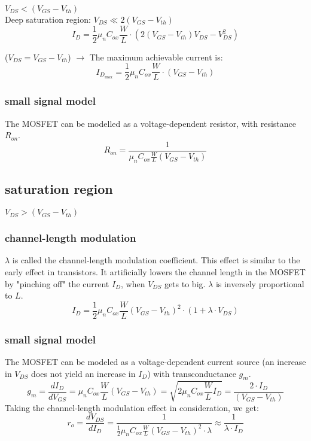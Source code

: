 \documentclass[11ypt]{extarticle}
\begin{document}
$V_{DS} < (V_{GS} - V_{th})$
\\
Deep saturation region: $V_{DS} \ll 2(V_{GS} - V_{th})$
\begin{equation}
    I_D = \frac{1}{2} \mu_n C_{ox} \frac{W}{L} \cdot (2(V_{GS} - V_{th})V_{DS} - {V_{DS}^2})
\end{equation}

($V_{DS} = V_{GS} - V_{th}$) $\rightarrow$ The maximum achievable current is: 
\begin{equation}
    I_{D_{\text{max}}} = \frac{1}{2} \mu_n C_{ox} \frac{W}{L} \cdot (V_{GS} - V_{th})
\end{equation}

\subsubsection{small signal model}

The MOSFET can be modelled as a voltage-dependent resistor, with resistance $R_{on}$.
\begin{equation}
   R_{on} = \frac{1}{\mu_n C_{ox} \frac{W}{L}(V_{GS} - V_{th})}
\end{equation}

\subsection{saturation region}

$V_{DS} > (V_{GS} - V_{th})$

\subsubsection{channel-length modulation}

$\lambda$ is called the channel-length modulation coefficient. This effect is similar to the early effect in transistors. It artificially lowers the channel length in the MOSFET by "pinching off" the current $I_D$, when $V_{DS}$ gets to big. $\lambda$ is inversely proportional to $L$.
\begin{equation}
    I_D= \frac{1}{2}\mu_n C_{ox} \frac{W}{L}(V_{GS} - V_{th})^2 \cdot (1 + \lambda \cdot V_{DS}) 
\end{equation}

\subsubsection{small signal model}

The MOSFET can be modeled as a voltage-dependent current source (an increase in $V_{DS}$ does not yield an increase in $I_D$) with transconductance $g_m$.
\begin{equation}
    g_m = \frac{dI_D}{dV_{GS}} = \mu_n C_{ox} \frac{W}{L}(V_{GS} - V_{th}) = \sqrt{2 \mu_n C_{ox} \frac{W}{L} I_D} = \frac{2 \cdot I_D}{(V_{GS} - V_{th})}
\end{equation}
Taking the channel-length modulation effect in consideration, we get:
\begin{equation}
    r_o = \frac{dV_{DS}}{dI_D} = \frac{1}{\frac{1}{2}\mu_n C_{ox} \frac{W}{L}(V_{GS} - V_{th})^2 \cdot\lambda} \approx \frac{1}{\lambda \cdot I_D}
\end{equation}
\end{document}
